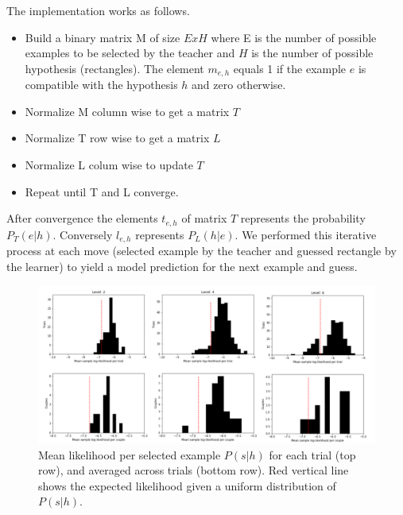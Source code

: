 \documentclass[a4paper,10pt]{article}
\begin{document}
The implementation works as follows. 

\begin{itemize}
 \item Build a binary matrix M of size $E x H$ where E is the number of possible examples to be selected by the teacher and $H$ is the number of possible hypothesis (rectangles). The element $m_{e,h}$ equals 1 if the example $e$ is compatible with the hypothesis $h$ and zero otherwise.
 \item Normalize M column wise to get a matrix $T$
 \item Normalize T row wise to get a matrix $L$
 \item Normalize L colum wise to update $T$
 \item Repeat until T and L converge.
\end{itemize}

After convergence the elements $t_{e,h}$ of matrix $T$ represents the probability $P_T(e|h)$. Conversely $l_{e,h}$ represents $P_L(h|e)$. We performed this iterative process at each move (selected example by the teacher and guessed rectangle by the learner) to yield a model prediction for the next example and guess.


\begin{figure}
    \centering
    \includegraphics[width=6.0in]{figures/likelihood_of_samples.pdf}
    \caption{Mean likelihood per selected example $P(s|h)$ for each trial (top row), and averaged across trials (bottom row). Red vertical line shows the expected likelihood given a uniform distribution of $P(s|h)$.}
    \label{dist_2_corners}
\end{figure}
\end{document}
